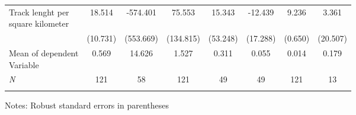 \begin{table}[H]
{\begin{threeparttable}
\begin{tabular}{lccccccc}
\addlinespace
\makecell{Track lenght per \\ square kilometer}&      18.514\sym{*}  &    -574.401         &      75.553         &      15.343         &     -12.439         &       9.236\sym{***}&       3.361         \\
                    &    (10.731)         &   (553.669)         &   (134.815)         &    (53.248)         &    (17.288)         &     (0.650)         &    (20.507)         \\
\midrule
\makecell{Mean of dependent \\ Variable}&       0.569         &      14.626         &       1.527         &       0.311         &       0.055         &       0.014         &       0.179         \\
\textit{N}          &         121         &          58         &         121         &          49         &          49         &         121         &          13         \\
\bottomrule[0.5pt]                                                                               \label{tab:table2}                                                                       \end{tabular}                                                                                                    \vspace{-13pt}                                                                                           \begin{tablenotes}[flushleft]{\setlength{\itemindent}{-3pt}}          \small                                                                                                           \item Notes: Robust standard errors in parentheses           \end{tablenotes}                                                                                         \end{threeparttable}                                                                             }                                                                                                                        \end{table}

